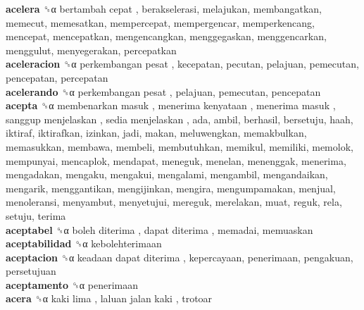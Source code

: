 \textbf{acelera} ␝α   bertambah cepat , berakselerasi, melajukan, membangatkan, memecut, memesatkan, mempercepat, mempergencar, memperkencang, mencepat, mencepatkan, mengencangkan, menggegaskan, menggencarkan, menggulut, menyegerakan, percepatkan  \\
\textbf{aceleracion} ␝α   perkembangan pesat , kecepatan, pecutan, pelajuan, pemecutan, pencepatan, percepatan  \\
\textbf{acelerando} ␝α   perkembangan pesat , pelajuan, pemecutan, pencepatan  \\
\textbf{acepta} ␝α   membenarkan masuk ,  menerima kenyataan ,  menerima masuk ,  sanggup menjelaskan ,  sedia menjelaskan , ada, ambil, berhasil, bersetuju, haah, iktiraf, iktirafkan, izinkan, jadi, makan, meluwengkan, memakbulkan, memasukkan, membawa, membeli, membutuhkan, memikul, memiliki, memolok, mempunyai, mencaplok, mendapat, meneguk, menelan, menenggak, menerima, mengadakan, mengaku, mengakui, mengalami, mengambil, mengandaikan, mengarik, menggantikan, mengijinkan, mengira, mengumpamakan, menjual, menoleransi, menyambut, menyetujui, mereguk, merelakan, muat, reguk, rela, setuju, terima  \\
\textbf{aceptabel} ␝α   boleh diterima ,  dapat diterima , memadai, memuaskan  \\
\textbf{aceptabilidad} ␝α  kebolehterimaan  \\
\textbf{aceptacion} ␝α   keadaan dapat diterima , kepercayaan, penerimaan, pengakuan, persetujuan  \\
\textbf{aceptamento} ␝α  penerimaan  \\
\textbf{acera} ␝α   kaki lima ,  laluan jalan kaki , trotoar  \\
